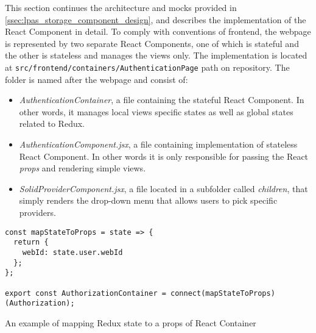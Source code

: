 This section continues the architecture and mocks provided in \autoref{ssec:lpas_storage_component_design}, and describes the implementation of the React Component in detail.
To comply with conventions of \lpa{} frontend, the webpage is represented by two separate React Components, one of which is stateful and the other is stateless and manages the views only. The implementation is located at \texttt{src/frontend/containers/AuthenticationPage} path on \lpa{} repository. The folder is named after the webpage and consist of:
\begin{itemize}
    \item \textit{AuthenticationContainer}, a file containing the stateful React Component. In other words, it manages local views specific states as well as global states related to Redux.
    \item \textit{AuthenticationComponent.jsx}, a file containing implementation of stateless React Component. In other words it is only responsible for passing the React \textit{props} and rendering simple views.
    \item \textit{SolidProviderComponent.jsx}, a file located in a subfolder called \textit{children}, that simply renders the drop-down menu that allows users to pick specific providers.
\end{itemize}

\begin{listing}[H]    
\begin{verbatim}
const mapStateToProps = state => {
  return {
    webId: state.user.webId
  };
};

export const AuthorizationContainer = connect(mapStateToProps)(Authorization);
\end{verbatim}
\caption{An example of mapping Redux state to a props of React Container} 
\label{lst:map_state_to_props_example}
\end{listing}

